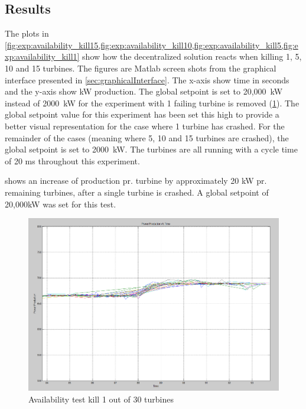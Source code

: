 \subsection{Results}
\label{sec:res:availability}
The plots in \cref{fig:exp:availability_kill15,fig:exp:availability_kill10,fig:exp:availability_kill5,fig:exp:availability_kill1} show how the decentralized solution reacts when killing 1, 5, 10 and 15 turbines. The figures are Matlab screen shots from the graphical interface presented in \cref{sec:graphicalInterface}. The x-axis show time in seconds and the y-axis show kW production. The global setpoint is set to 20,000~kW instead of 2000~kW for the experiment with 1 failing turbine is removed (\cref{fig:exp:availability_kill1}). The global setpoint value for this experiment has been set this high to provide a better visual representation for the case where 1 turbine has crashed. 
For the remainder of the cases (meaning where 5, 10 and 15 turbines are crashed), the global setpoint is set to 2000~kW.
The turbines are all running with a cycle time of 20 ms throughout this experiment.

\clearpage
{} shows an increase of production pr. turbine by approximately 20 kW pr. remaining turbines, after a single turbine is crashed. A global setpoint of 20,000kW was set for this test.

\begin{figure} [!h]
	\centering
	\includegraphics[width=\resultsFigureWidthScale\textwidth]{figures/Results/availabilitytest30-29_setpoint_20000.PNG}
	\caption{Availability test kill 1 out of 30 turbines}
	\label{fig:exp:availability_kill1}
\end{figure}

